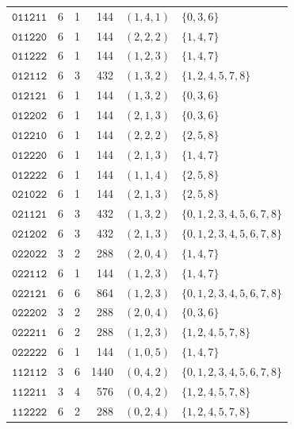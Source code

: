 \begin{longtable}{@{}lrrrrl@{}}
\(\mathtt{011211}\)&6&1&144&\((1,4,1)\)&\(\{0,3,6\}\)\\
\(\mathtt{011220}\)&6&1&144&\((2,2,2)\)&\(\{1,4,7\}\)\\
\(\mathtt{011222}\)&6&1&144&\((1,2,3)\)&\(\{1,4,7\}\)\\
\(\mathtt{012112}\)&6&3&432&\((1,3,2)\)&\(\{1,2,4,5,7,8\}\)\\
\(\mathtt{012121}\)&6&1&144&\((1,3,2)\)&\(\{0,3,6\}\)\\
\(\mathtt{012202}\)&6&1&144&\((2,1,3)\)&\(\{0,3,6\}\)\\
\(\mathtt{012210}\)&6&1&144&\((2,2,2)\)&\(\{2,5,8\}\)\\
\(\mathtt{012220}\)&6&1&144&\((2,1,3)\)&\(\{1,4,7\}\)\\
\(\mathtt{012222}\)&6&1&144&\((1,1,4)\)&\(\{2,5,8\}\)\\
\(\mathtt{021022}\)&6&1&144&\((2,1,3)\)&\(\{2,5,8\}\)\\
\(\mathtt{021121}\)&6&3&432&\((1,3,2)\)&\(\{0,1,2,3,4,5,6,7,8\}\)\\
\(\mathtt{021202}\)&6&3&432&\((2,1,3)\)&\(\{0,1,2,3,4,5,6,7,8\}\)\\
\(\mathtt{022022}\)&3&2&288&\((2,0,4)\)&\(\{1,4,7\}\)\\
\(\mathtt{022112}\)&6&1&144&\((1,2,3)\)&\(\{1,4,7\}\)\\
\(\mathtt{022121}\)&6&6&864&\((1,2,3)\)&\(\{0,1,2,3,4,5,6,7,8\}\)\\
\(\mathtt{022202}\)&3&2&288&\((2,0,4)\)&\(\{0,3,6\}\)\\
\(\mathtt{022211}\)&6&2&288&\((1,2,3)\)&\(\{1,2,4,5,7,8\}\)\\
\(\mathtt{022222}\)&6&1&144&\((1,0,5)\)&\(\{1,4,7\}\)\\
\(\mathtt{112112}\)&3&6&1440&\((0,4,2)\)&\(\{0,1,2,3,4,5,6,7,8\}\)\\
\(\mathtt{112211}\)&3&4&576&\((0,4,2)\)&\(\{1,2,4,5,7,8\}\)\\
\(\mathtt{112222}\)&6&2&288&\((0,2,4)\)&\(\{1,2,4,5,7,8\}\)\\
\bottomrule
\end{longtable}


